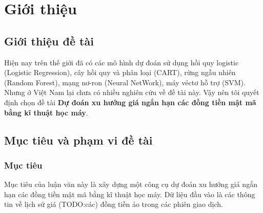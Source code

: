 \chapter{Giới thiệu} 
\section{Giới thiệu đề tài}
Hiện nay trên thế giới đã có các mô hình dự đoán sử dụng hồi quy logistic
(Logistic Regression), cây hồi quy và phân loại (CART),
rừng ngẫu nhiên (Random Forest),
mạng nơ-ron (Neural NetWork),
máy véctơ hỗ trợ (SVM).
Nhưng ở Việt Nam lại chưa có nhiều nghiên cứu về đề tài này.
Vậy nên tôi quyết định chọn đề tài \textbf{Dự đoán xu hướng giá ngắn hạn các đồng tiền mật mã bằng kĩ thuật học máy}.
\section{Mục tiêu và phạm vi đề tài}
\subsection{Mục tiêu}
Mục tiêu của luận văn này là xây dựng một công cụ dự đoán xu hướng giá ngắn hạn
các đồng tiền mật mã bằng kĩ thuật học máy. Dữ liệu đầu vào là các thông tin về
lịch sử giá (TODO:các)  đồng tiền ảo trong các phiên giao dịch.
